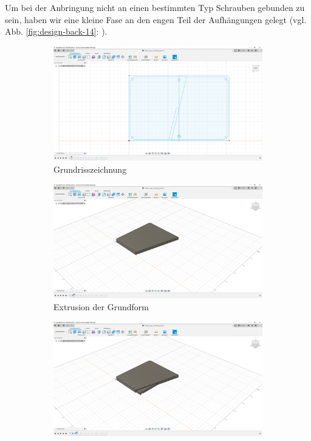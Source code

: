 Um bei der Anbringung nicht an einen bestimmten Typ Schrauben gebunden zu sein, haben wir eine kleine Fase an den engen Teil der Aufhängungen gelegt (vgl. Abb. \ref{fig:design-back-14}: ). 
\begin{figure}[H]
	\begin{subfigure}[t]{.3\linewidth}
		\includegraphics[width=\linewidth]{img/konstruktion_gehaeuse_hinten_001.png}
		\caption[Grundrisszeichnung]{Grundrisszeichnung}
		\label{fig:design-back-01}
	\end{subfigure}	
	\begin{subfigure}[t]{.3\linewidth}
		\includegraphics[width=\linewidth]{img/konstruktion_gehaeuse_hinten_002.png}
		\caption[Extrusion der Grundform]{Extrusion der Grundform}
		\label{fig:design-back-02}
	\end{subfigure}
	\begin{subfigure}[t]{.3\linewidth}
		\includegraphics[width=\linewidth]{img/konstruktion_gehaeuse_hinten_003.png}

\end{subfigure}
\end{figure}
